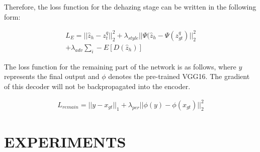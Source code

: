 \documentclass[lettersize,journal]{IEEEtran}
\begin{document}
Therefore, the loss function for the dehazing stage can be written in the following form:

\begin{equation}
\label{encoder_loss}
\begin{split}
L_{E} =||\widehat{z}_{h} - z^{q}_{t} ||_{2}^{2} + \lambda_{style} ||\Psi(\widehat{z}_{h} - \Psi(z^{q}_{gt}) ||_{2}^{2} \\ 
+ \lambda_{adv}\sum_{i} -E[D(\widehat{z}_{h})]
\end{split}
\end{equation}

The loss function for the remaining part of the network is as follows, where $y$ represents the final output and $\phi$ denotes the pre-trained VGG16\cite{simonyan2014very}. The gradient of this decoder will not be backpropagated into the encoder.

\begin{equation}
	\label{rest_loss}
	\begin{split}
		L_{remain} =||y - x_{gt} ||_{1} + \lambda_{per} ||\phi(y) - \phi(x_{gt}) ||_{2}^{2}
	\end{split}
\end{equation}



\section{EXPERIMENTS}
\end{document}
